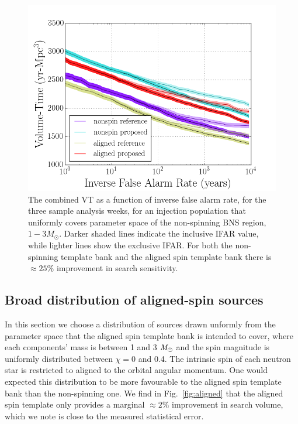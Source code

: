 \begin{figure}
\centering
\includegraphics[width=1.0\textwidth]{papers/bns_o1_dev/figures/ns_combined.png}
\caption{\label{fig:nonspin} 
The combined VT as a function of inverse false alarm rate, for the
three sample analysis weeks, for an injection population that uniformly covers parameter space of the non-spinning BNS region, $1- 3M_\odot$. Darker shaded lines indicate the inclusive IFAR value, while lighter lines show the exclusive IFAR. For both the non-spinning template bank and the aligned spin template bank there is $\approx 25 \%$ improvement in search sensitivity.
}
\end{figure}

\subsection{Broad distribution of aligned-spin sources}
\label{sec:baligned}

In this section we choose a distribution of sources drawn unformly from the parameter space that the aligned spin template bank is intended to cover, where each components' mass is between 1 and 3 $\mathit{M}_\odot$ and the spin magnitude is uniformly distributed between $\chi=$0 and 0.4. The intrinsic spin of each neutron star is restricted to aligned to the orbital angular momentum. One would expected this distribution to be more favourable to the aligned spin template bank than the non-spinning one. We find in Fig.~\ref{fig:aligned} that the aligned spin template only provides a marginal $\approx 2\%$ improvement in search volume, which we note is close to the measured statistical error. 

